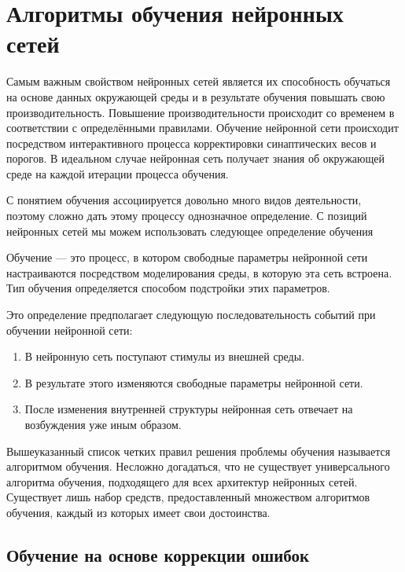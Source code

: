 \section{Алгоритмы обучения нейронных сетей}

Самым важным свойством нейронных сетей является их способность обучаться на основе данных окружающей среды и в  результате обучения повышать свою производительность.
Повышение производительности происходит со временем в соответствии с определёнными правилами.
Обучение нейронной сети происходит посредством интерактивного
процесса корректировки синаптических весов и порогов.
В идеальном случае нейронная сеть получает знания об окружающей среде на каждой итерации процесса обучения.

С понятием обучения ассоциируется довольно много видов деятельности, поэтому сложно дать этому процессу однозначное определение.
С позиций нейронных сетей мы можем использовать следующее определение обучения
\begin{Def}
Обучение ---  это процесс, в котором свободные параметры нейронной сети настраиваются посредством моделирования среды, в которую эта сеть встроена.
Тип обучения определяется способом подстройки этих параметров. 
\end{Def}

Это определение предполагает следующую последовательность событий при обучении нейронной сети:

\begin{enumerate}
	\item В нейронную сеть поступают стимулы из внешней среды.

	\item В результате этого изменяются свободные параметры нейронной сети.

	\item После изменения внутренней структуры нейронная сеть отвечает на возбуждения уже иным образом.
\end{enumerate}

Вышеуказанный список четких правил решения проблемы обучения называется алгоритмом обучения. 
Несложно догадаться, что не существует универсального алгоритма обучения, подходящего для всех архитектур нейронных сетей.
Существует лишь набор средств, предоставленный множеством алгоритмов обучения, каждый из которых имеет свои достоинства.\cite{NejronnyeSeti}

\subsection{Обучение на основе коррекции ошибок}

